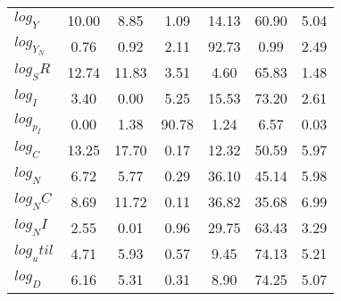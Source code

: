 \begin{center}
\begin{longtable}{lcccccc}
$log_Y     $	 & 	       10.00	 & 	        8.85	 & 	        1.09	 & 	       14.13	 & 	       60.90	 & 	        5.04 \\ 
$log_Y_N   $	 & 	        0.76	 & 	        0.92	 & 	        2.11	 & 	       92.73	 & 	        0.99	 & 	        2.49 \\ 
$log_SR    $	 & 	       12.74	 & 	       11.83	 & 	        3.51	 & 	        4.60	 & 	       65.83	 & 	        1.48 \\ 
$log_I     $	 & 	        3.40	 & 	        0.00	 & 	        5.25	 & 	       15.53	 & 	       73.20	 & 	        2.61 \\ 
$log_p_I   $	 & 	        0.00	 & 	        1.38	 & 	       90.78	 & 	        1.24	 & 	        6.57	 & 	        0.03 \\ 
$log_C     $	 & 	       13.25	 & 	       17.70	 & 	        0.17	 & 	       12.32	 & 	       50.59	 & 	        5.97 \\ 
$log_N     $	 & 	        6.72	 & 	        5.77	 & 	        0.29	 & 	       36.10	 & 	       45.14	 & 	        5.98 \\ 
$log_NC    $	 & 	        8.69	 & 	       11.72	 & 	        0.11	 & 	       36.82	 & 	       35.68	 & 	        6.99 \\ 
$log_NI    $	 & 	        2.55	 & 	        0.01	 & 	        0.96	 & 	       29.75	 & 	       63.43	 & 	        3.29 \\ 
$log_util  $	 & 	        4.71	 & 	        5.93	 & 	        0.57	 & 	        9.45	 & 	       74.13	 & 	        5.21 \\ 
$log_D     $	 & 	        6.16	 & 	        5.31	 & 	        0.31	 & 	        8.90	 & 	       74.25	 & 	        5.07 \\ 
\end{longtable}
 \end{center}
